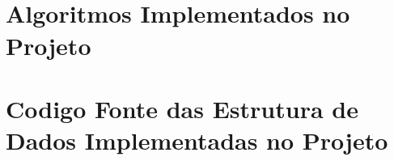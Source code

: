 \documentclass[a4paper,12pt]{article}
\begin{document}
\newpage
\appendix
\begin{appendices}
\section{\\Algoritmos Implementados no Projeto} \label{App:AppendixA}










\section{Codigo Fonte das Estrutura de Dados Implementadas no Projeto} \label{App:AppendixE}



\end{appendices}



\end{document}

